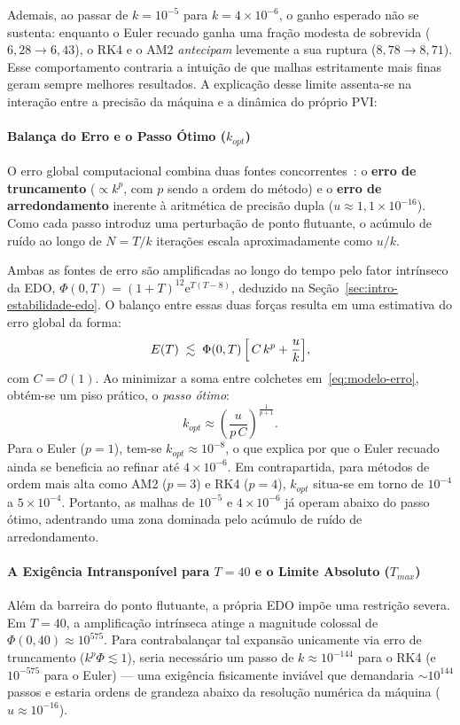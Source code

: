 \documentclass[12pt, a4paper]{article}
\begin{document}
Ademais, ao passar de $k = 10^{-5}$ para $k = 4 \times 10^{-6}$, o ganho esperado não se sustenta: enquanto o Euler recuado ganha uma fração modesta de sobrevida ($6{,}28 \to 6{,}43$), o RK4 e o AM2 \emph{antecipam} levemente a sua ruptura ($8{,}78 \to 8{,}71$). Esse comportamento contraria a intuição de que malhas estritamente mais finas geram sempre melhores resultados. A explicação desse limite assenta-se na interação entre a precisão da máquina e a dinâmica do próprio PVI:

\paragraph{Balança do Erro e o Passo Ótimo ($k_{opt}$)}
O erro global computacional combina duas fontes concorrentes~\cite{higham2002}: o \textbf{erro de truncamento} ($\propto k^p$, com $p$ sendo a ordem do método) e o \textbf{erro de arredondamento} inerente à aritmética de precisão dupla ($u \approx 1{,}1 \times 10^{-16}$). Como cada passo introduz uma perturbação de ponto flutuante, o acúmulo de ruído ao longo de $N = T/k$ iterações escala aproximadamente como $u/k$.

Ambas as fontes de erro são amplificadas ao longo do tempo pelo fator intrínseco da EDO, $\Phi(0, T) = (1+T)^{12}\mathrm{e}^{T(T-8)}$, deduzido na Seção~\ref{sec:intro-estabilidade-edo}. O balanço entre essas duas forças resulta em uma estimativa do erro global da forma:
\begin{equation}\label{eq:modelo-erro}
  E(T) \;\lesssim\; \Phi(0,T)\,\Bigl[\, C\,k^p + \frac{u}{k} \Bigr],
\end{equation}
com $C = \mathcal{O}(1)$. Ao minimizar a soma entre colchetes em~\eqref{eq:modelo-erro}, obtém-se um piso prático, o \emph{passo ótimo}:
\begin{equation}\label{eq:kopt}
  k_{opt} \approx \left(\frac{u}{p\,C}\right)^{\frac{1}{p+1}}.
\end{equation}
Para o Euler ($p=1$), tem-se $k_{opt} \approx 10^{-8}$, o que explica por que o Euler recuado ainda se beneficia ao refinar até $4 \times 10^{-6}$. Em contrapartida, para métodos de ordem mais alta como AM2 ($p=3$) e RK4 ($p=4$), $k_{opt}$ situa-se em torno de $10^{-4}$ a $5 \times 10^{-4}$. Portanto, as malhas de $10^{-5}$ e $4 \times 10^{-6}$ já operam abaixo do passo ótimo, adentrando uma zona dominada pelo acúmulo de ruído de arredondamento.

\paragraph{A Exigência Intransponível para $T=40$ e o Limite Absoluto ($T_{max}$)}
Além da barreira do ponto flutuante, a própria EDO impõe uma restrição severa. Em $T=40$, a amplificação intrínseca atinge a magnitude colossal de $\Phi(0, 40) \approx 10^{575}$. Para contrabalançar tal expansão unicamente via erro de truncamento ($k^p \Phi \lesssim 1$), seria necessário um passo de $k \approx 10^{-144}$ para o RK4 (e $10^{-575}$ para o Euler) — uma exigência fisicamente inviável que demandaria $\sim 10^{144}$ passos e estaria ordens de grandeza abaixo da resolução numérica da máquina ($u \approx 10^{-16}$).
\end{document}
